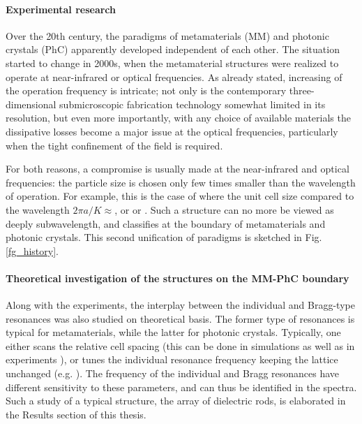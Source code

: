 \paragraph{Experimental research}%
Over the 20th century, the paradigms of metamaterials (MM) and photonic crystals (PhC) apparently developed independent of each other. The situation started to change in 2000s, when the metamaterial structures were realized to operate at near-infrared or optical frequencies. As already stated, increasing of the operation frequency is intricate; not only is the contemporary three-dimensional submicroscopic fabrication technology somewhat limited in its resolution, but even more importantly, with any choice of available materials the dissipative losses become a major issue at the optical frequencies, particularly when the tight confinement of the field is required. 

For both reasons,  a compromise is usually made at the near-infrared and optical frequencies: the particle size is chosen only few times smaller than the wavelength of operation. For example, this is the case of  %
where the unit cell size compared to the wavelength $2\pi a/K \approx $, %
or %
or %
. Such a structure can no more be viewed as deeply subwavelength, and classifies at the boundary of metamaterials and photonic crystals. This second unification of paradigms is sketched in Fig. \ref{fg_history}. 

\paragraph{Theoretical investigation of the structures on the MM-PhC boundary}%
Along with the experiments, the interplay between the individual and Bragg-type resonances was also studied on theoretical basis. The former type of resonances is typical for metamaterials, while the latter for photonic crystals. Typically, one either scans the relative cell spacing (this can be done in simulations \cite{shi2007, dominec2014transition} as well as in experiments \cite{rybin2015}),  %
or tunes the individual resonance frequency keeping the lattice unchanged (e.g. \cite{chakrabarti2012magnetic}). The frequency of the individual and Bragg resonances have different sensitivity to these parameters, and can thus be identified in the spectra. Such a study of a typical structure, the array of dielectric rods, is elaborated in the Results section of this thesis.

